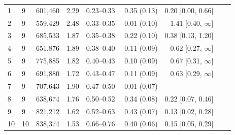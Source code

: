\begin{tabular}{llrrrrrrr}
\midrule
1 & 9 & 601,460 & 2.29 & 0.23--0.33 & 0.35 (0.13) & 0.20 [0.00, 0.66] & & \\
2 & 9 & 559,429 & 2.48 & 0.33--0.35 & 0.01 (0.10) & 1.41 [0.40, $\infty$] & & \\
3 & 9 & 685,533 & 1.87 & 0.35--0.38 & 0.22 (0.10) & 0.38 [0.13, 1.20] & & \\
4 & 9 & 651,876 & 1.89 & 0.38--0.40 & 0.11 (0.09) & 0.62 [0.27, $\infty$] & & \\
5 & 9 & 775,885 & 1.82 & 0.40--0.43 & 0.10 (0.09) & 0.67 [0.31, $\infty$] & & \\
6 & 9 & 691,880 & 1.72 & 0.43--0.47 & 0.11 (0.09) & 0.63 [0.29, $\infty$] & & \\
7 & 9 & 707,643 & 1.90 & 0.47--0.50 & -0.01 (0.07) & -- & & \\
8 & 9 & 638,674 & 1.76 & 0.50--0.52 & 0.34 (0.08) & 0.22 [0.07, 0.46] & & \\
9 & 9 & 821,212 & 1.62 & 0.52--0.63 & 0.43 (0.07) & 0.13 [0.02, 0.28] & & \\
10 & 10 & 838,374 & 1.53 & 0.66--0.76 & 0.40 (0.06) & 0.15 [0.05, 0.29] & & \\
\bottomrule
\end{tabular}
